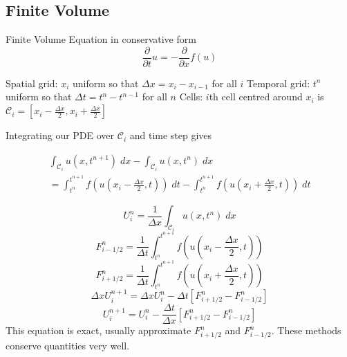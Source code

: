 \documentclass[pdf]{beamer}
\begin{document}
\subsection{Finite Volume}

\begin{frame}{Finite Volume}
	Equation in conservative form
	\[\frac{\partial }{\partial t}u = - \frac{\partial }{\partial x}f(u) \]
	
	Spatial grid: $x_i$ uniform so that $\Delta x = x_i - x_{i-1}$ for all $i$
	\vskip 0.2cm
	Temporal grid: $t^n$ uniform so that $\Delta t = t^n - t^{n-1}$ for all $n$
	\vskip 0.2cm
	Cells: $i$th cell centred around $x_i$ is $\mathcal{C}_i = \left[x_i - \frac{\Delta x}{2},x_i + \frac{\Delta x}{2} \right]$
	
\end{frame}

\begin{frame}
	Integrating our PDE over $\mathcal{C}_i$ and time step gives

	\begin{multline*}
	\int_{\mathcal{C}_i}u(x,t^{n+1}) \;dx -\int_{\mathcal{C}_i}u(x,t^{n}) \;dx  \\=  \int_{t^n}^{t^{n+1}}f\left(u\left(x_i - \frac{\Delta x}{2},t \right)\right) \; dt - \int_{t^n}^{t^{n+1}}f\left(u\left(x_i +  \frac{\Delta x}{2},t \right)\right) \; dt
	\end{multline*}
	
\end{frame}

\begin{frame}	
	$$U^n_i = \frac{1}{\Delta x}\int_{\mathcal{C}_i}u(x,t^{n}) \;dx$$
	$$F^n_{i - 1/2} = \frac{1}{\Delta t}\int_{t^n}^{t^{n+1}}f\left(u\left(x_i -  \frac{\Delta x}{2},t \right)\right)$$
	$$F^n_{i + 1/2} = \frac{1}{\Delta t}\int_{t^n}^{t^{n+1}}f\left(u\left(x_i +  \frac{\Delta x}{2},t \right)\right)$$
	\pause	
	\[\Delta x U^{n+1}_i = \Delta x U^n_i -\Delta t \left[F^n_{i+1/2} - F^n_{i-1/2}\right]\] 
	\pause	
	\[ U^{n+1}_i =  U^n_i - \frac{\Delta t}{\Delta x} \left[F^n_{i+1/2} - F^n_{i-1/2}\right]\] 	
	This equation is exact, usually approximate $F^n_{i+1/2}$ and $F^n_{i-1/2}$. These methods conserve quantities very well.
	
\end{frame}
\end{document}
